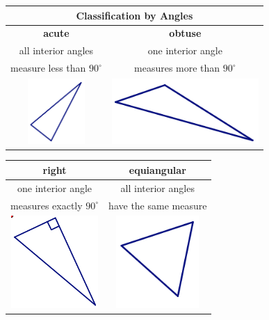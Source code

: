 \begin{center}
\begin{tabular}{c|c}\hline
\multicolumn{2}{c}{\bf Classification by Angles}\\
\hline\hline
{\bf acute} & {\bf obtuse} \\
\hline
all interior angles   & one interior angle   \\
measure less than $90^\circ$ &  measures more than $90^\circ$ \\
\hline
\includegraphics[height=2.5cm]{isos} & 
\includegraphics[height=2.5cm]{scalene}  \\
\hline
\end{tabular}

\smallskip

\begin{tabular}{c|c}\hline\label{def:triangs}
{\bf right } & {\bf equiangular} \\
\hline
 one interior angle  & all interior angles \\
 measures exactly $90^\circ$ & have the same measure\\
\hline
\includegraphics[height=3.5cm]{rttri} & 
\includegraphics[height=3.5cm]{equilat}  \\
\hline
\end{tabular}

\end{center}


